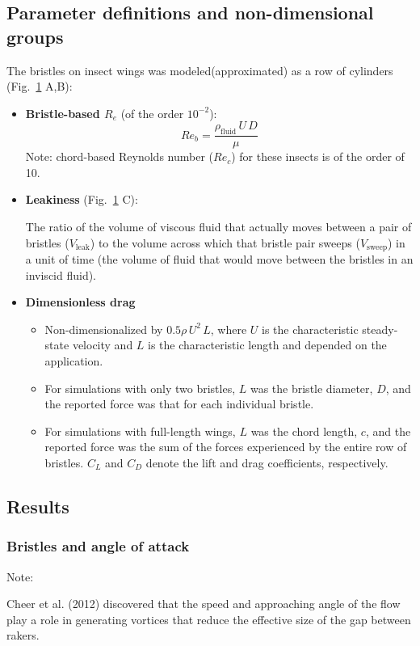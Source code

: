 \documentclass[preprint, letterpaper, nobibnotes, aps, superscriptaddress,prb]{revtex4-1}
\begin{document}
\subsection{Parameter definitions and non-dimensional groups}
The bristles on insect wings was modeled(approximated) as a row of cylinders (Fig.~\ref{fig1} A,B):

\begin{figure}[H]
  \centering {}
  \caption{}\label{fig1}
\end{figure}

\begin{itemize}
\item 
\textbf{Bristle-based $R_e$} (of the order $10^{-2}$):
\begin{equation*}
Re_b = \frac{\rho_{\mathrm{fluid}}\,U\,D}{\mu}
\end{equation*}
Note: chord-based Reynolds number ($Re_c$) for these insects is of the order of 10.
\item 
\textbf{Leakiness} (Fig.~\ref{fig1} C):

The ratio of the volume of viscous fluid that actually moves between a pair of bristles ($V_\mathrm{leak}$) to the volume across which that bristle pair sweeps ($V_{\mathrm{sweep}}$) in a unit of time (the volume of fluid that would move between the bristles in an inviscid fluid).


\item
\textbf{Dimensionless drag}
\begin{itemize}
	\item
Non-dimensionalized by $0.5\rho\,U^2\,L$, where $U$ is the characteristic steady-state velocity and $L$ is the characteristic length and depended on the application. 
	\item
For simulations with only two bristles, $L$ was the bristle diameter, $D$, and the reported force was that for each individual bristle. 
	\item
For simulations with full-length wings, $L$ was the chord length, $c$, and the reported force was the sum of the forces experienced by the entire row of bristles. $C_L$ and $C_D$ denote the lift and drag coefficients, respectively.
\end{itemize}
\end{itemize}

\subsection{Results}
\subsubsection{Bristles and angle of attack}

Note:

 Cheer et al. (2012) discovered that the speed and approaching angle of the flow play a role in generating vortices that reduce the effective size of the gap between rakers.
\end{document}
